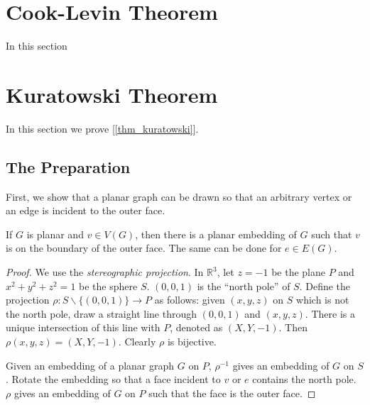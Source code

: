 

    \section{Cook-Levin Theorem}
        In this section
    
    \section{Kuratowski Theorem}
        In this section we prove [\ref{thm_kuratowski}].
        
    
    \subsection{The Preparation}
    
        First, we show that a planar graph can be drawn so that an arbitrary vertex or an edge is incident to the outer face.
    
        \begin{lemma} \label{lem_stereographic}
            If $G$ is planar and $v \in V(G)$, then there is a planar embedding of $G$ such that $v$ is on the boundary of the outer face. The same can be done for $e \in E(G)$.
        \end{lemma}
        
        \begin{proof}
            We use the \emph{stereographic projection}. In $\mathbb{R}^3$, let $z=-1$ be the plane $P$ and $x^2+y^2+z^2=1$ be the sphere $S$. $(0,0,1)$ is the ``north pole'' of $S$. Define the projection $\rho: S \backslash \{(0,0,1)\} \rightarrow P$ as follows: given $(x,y,z)$ on $S$ which is not the north pole, draw a straight line through $(0,0,1)$ and $(x,y,z)$. There is a unique intersection of this line with $P$, denoted as $(X,Y,-1)$. Then $\rho(x,y,z)=(X,Y,-1)$. Clearly $\rho$ is bijective.
            
            Given an embedding of a planar graph $G$ on $P$, $\rho^{-1}$ gives an embedding of $G$ on $S$. Rotate the embedding so that a face incident to $v$ or $e$ contains the north pole. $\rho$ gives an embedding of $G$ on $P$ such that the face is the outer face.
        \end{proof}
        
